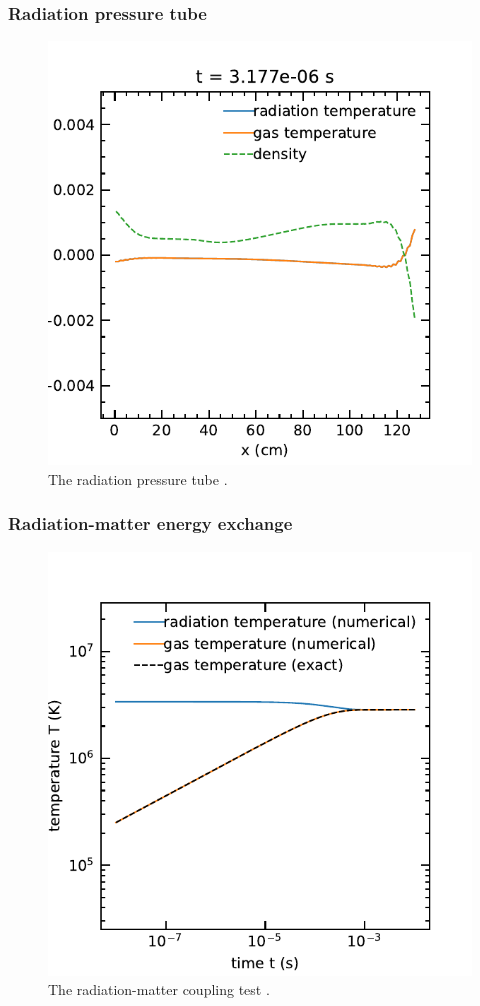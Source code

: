 \documentclass[fleqn,usenatbib]{mnras}
\begin{document}
\subsubsection{Radiation pressure tube}
\begin{figure}
    \includegraphics[width=\columnwidth]{radiation_pressure_tube.pdf}
    \caption{The radiation pressure tube \citep{Krumholz_2007}.}
    \label{fig:radiation_pressure_tube}
\end{figure}
\subsubsection{Radiation-matter energy exchange}
\begin{figure}
    \includegraphics[width=\columnwidth]{radcoupling.pdf}
    \caption{The radiation-matter coupling test \citep{Turner_2001}.}
    \label{fig:radcoupling}
\end{figure}
\end{document}
